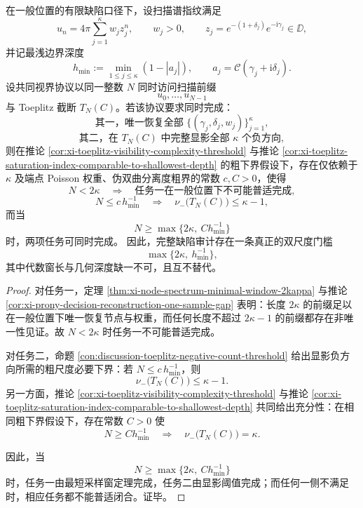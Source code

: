 \begin{theorem}[完整缺陷审计的双尺度阈值]\label{thm:conclusion-visible-complete-defect-audit-dual-scale-threshold}
在一般位置的有限缺陷口径下，设扫描谱指纹满足
\[
u_n=4\pi\sum_{j=1}^{\kappa}w_j z_j^n,
\qquad
w_j>0,
\qquad
z_j=e^{-(1+\delta_j)}e^{-\mathrm{i}\gamma_j}\in\DD,
\]
并记最浅边界深度
\[
h_{\min}:=\min_{1\le j\le \kappa}(1-|a_j|),
\qquad
a_j=\mathcal C(\gamma_j+\mathrm{i}\delta_j).
\]
设共同视界协议以同一整数 \(N\) 同时访问扫描前缀
\[
u_0,\dots,u_{N-1}
\]
与 Toeplitz 截断 \(T_N(C)\)。若该协议要求同时完成：
\[
\text{其一，唯一恢复全部 } \{(\gamma_j,\delta_j,w_j)\}_{j=1}^{\kappa},
\]
\[
\text{其二，在 }T_N(C)\text{ 中完整显影全部 }\kappa\text{ 个负方向},
\]
则在推论 \ref{cor:xi-toeplitz-visibility-complexity-threshold} 与推论 \ref{cor:xi-toeplitz-saturation-index-comparable-to-shallowest-depth} 的粗下界假设下，存在仅依赖于 \(\kappa\) 及端点 Poisson 权重、伪双曲分离度粗界的常数 \(c,C>0\)，使得
\[
N<2\kappa
\quad\Longrightarrow\quad
\text{任务一在一般位置下不可能普适完成},
\]
\[
N\le c\,h_{\min}^{-1}
\quad\Longrightarrow\quad
\nu_-\!\bigl(T_N(C)\bigr)\le \kappa-1,
\]
而当
\[
N\ge \max\{2\kappa,\ Ch_{\min}^{-1}\}
\]
时，两项任务可同时完成。
因此，完整缺陷审计存在一条真正的双尺度门槛
\[
\max\{2\kappa,\ h_{\min}^{-1}\},
\]
其中代数窗长与几何深度缺一不可，且互不替代。
\end{theorem}
\begin{proof}
对任务一，定理 \ref{thm:xi-node-spectrum-minimal-window-2kappa} 与推论 \ref{cor:xi-prony-decision-reconstruction-one-sample-gap} 表明：长度 \(2\kappa\) 的前缀足以在一般位置下唯一恢复节点与权重，而任何长度不超过 \(2\kappa-1\) 的前缀都存在非唯一性见证。故 \(N<2\kappa\) 时任务一不可能普适完成。

对任务二，命题 \ref{con:discussion-toeplitz-negative-count-threshold} 给出显影负方向所需的粗尺度必要下界：若 \(N\le c\,h_{\min}^{-1}\)，则
\[
\nu_-\!\bigl(T_N(C)\bigr)\le \kappa-1.
\]
另一方面，推论 \ref{cor:xi-toeplitz-visibility-complexity-threshold} 与推论 \ref{cor:xi-toeplitz-saturation-index-comparable-to-shallowest-depth} 共同给出充分性：在相同粗下界假设下，存在常数 \(C>0\) 使
\[
N\ge Ch_{\min}^{-1}
\quad\Longrightarrow\quad
\nu_-\!\bigl(T_N(C)\bigr)=\kappa.
\]

因此，当
\[
N\ge \max\{2\kappa,\ Ch_{\min}^{-1}\}
\]
时，任务一由最短采样窗定理完成，任务二由显影阈值完成；而任何一侧不满足时，相应任务都不能普适闭合。证毕。
\end{proof}


